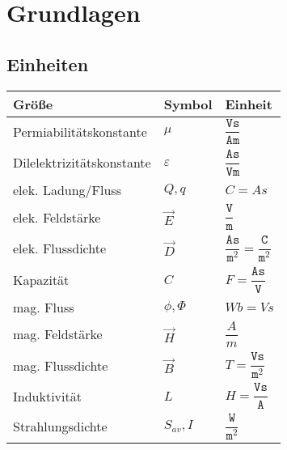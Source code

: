\section{Grundlagen}
\subsection{Einheiten}
\begin{table}[H]
	\renewcommand{\arraystretch}{2.15}
\begin{tabularx}{0.9\columnwidth}{lXl}
	Größe & Symbol & Einheit\\
	\hline
	Permiabilitätskonstante & $\mu$ &  $\dfrac{\texttt{Vs}}{\texttt{Am}}$\\
	\hline
	Dilelektrizitätskonstante & $\varepsilon$ &  $\dfrac{\texttt{As}}{\texttt{Vm}}$\\
		\hline
	elek. Ladung/Fluss & $ Q, q $ & $ C=As $\\
	\hline
	elek. Feldstärke & $ \vec{E} $ & $\dfrac{\texttt{V}}{\texttt{m}}$\\
	\hline
	elek. Flussdichte & $ \vec{D} $ & $\dfrac{\texttt{As}}{\texttt{m}^2}=\dfrac{\texttt{C}}{\texttt{m}^2}$\\
	\hline
	Kapazität & $C$ &  $F= \dfrac{\texttt{As}}{\texttt{V}}$\\
		\hline
	mag. Fluss& $\phi, \Phi$ &  $Wb = Vs$\\
		\hline
	mag. Feldstärke & $\vec{H}$ &  $\dfrac{A}{m}$\\
		\hline
	mag. Flussdichte & $\vec{B}$ &  $T = \dfrac{\texttt{Vs}}{\texttt{m}^2}$\\
	\hline
	Induktivität & $L$ &  $H = \dfrac{\texttt{Vs}}{\texttt{A}}$\\
		\hline
	Strahlungsdichte & $S_{av}, I$ &  $\dfrac{\texttt{W}}{\texttt{m}^2}$\\
				

\end{tabularx}
\end{table}
